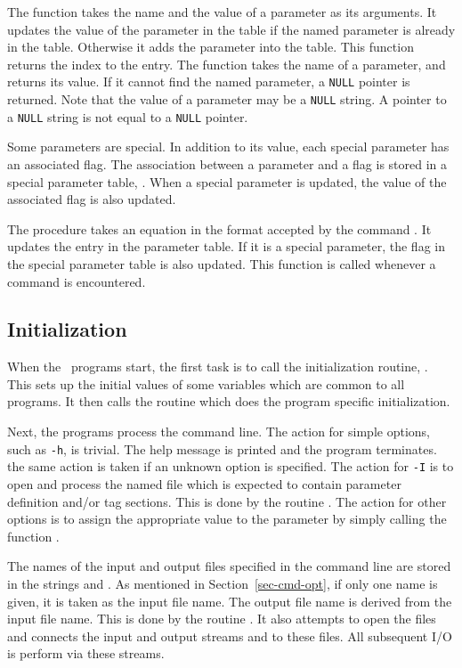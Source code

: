  The function 
takes the name and the value of a parameter as its arguments. It
updates the value of the parameter in the table if the named parameter
is already in the table. Otherwise it adds the parameter into the
table. This function returns the index to the entry. The function
 takes the name of a parameter, and returns its
value. If it cannot find the named parameter, a {\tt NULL} pointer is
returned. Note that the value of a parameter may be a {\tt NULL}
string. A pointer to a {\tt NULL} string is not equal to a {\tt NULL}
pointer.

Some parameters are special. In addition to its value, each  special
parameter has an associated flag. The association between a parameter
and a flag is stored in a special parameter table,
. When a special parameter is updated, the value
of the associated flag is also updated. 


The procedure  takes an equation in the format
accepted by the command . It updates the entry in the
parameter table. If it is a special parameter, the flag in the special
parameter table is also updated. This function is called whenever a
 command is encountered.

\subsection{Initialization}

When the \mweb\ programs start, the first task is to call the
initialization routine, . This sets up the initial values
of some variables which are common to all programs. It then calls the
routine  which does the program specific
initialization. 

Next, the programs process the command line. The action for simple
options, such as {\tt -h}, is trivial. The help message is printed and
the program terminates.  the same action is taken if an unknown option
is specified. The action for {\tt -I} is to open and process the
named file which is expected to contain parameter definition and/or tag
sections. This is done by the routine .  The
action for other options is to assign the 
appropriate value to the parameter by  simply calling the function
. 

The names of the input
and output files specified in the command line are stored in the
strings  and . As mentioned in
Section~\ref{sec-cmd-opt}, if only one name is given, it is taken as
the input file name. The output file name is derived from the input
file name. This is done by the routine . It also
attempts to open the files and connects the input and output
streams  and  to these files. All
subsequent I/O is perform via these streams.

